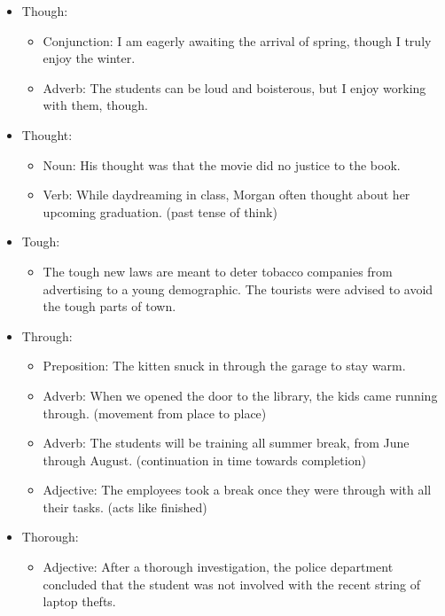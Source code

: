 \documentclass[a4paper,12pt]{report}
\begin{document}
\begin{itemize}
  \item Though:
    \begin{itemize}
      \item Conjunction: I am eagerly awaiting the arrival of spring, though I truly enjoy the winter.
      \item Adverb: The students can be loud and boisterous, but I enjoy working with them, though.
    \end{itemize}
  \item Thought:
    \begin{itemize}
      \item Noun: His thought was that the movie did no justice to the book.
      \item Verb: While daydreaming in class, Morgan often thought about her upcoming graduation. (past tense of think)
    \end{itemize}
  \item Tough:
    \begin{itemize}
      \item The tough new laws are meant to deter tobacco companies from advertising to a young demographic. The tourists were advised to avoid the tough parts of town.
    \end{itemize}
  \item Through:
    \begin{itemize}
      \item Preposition: The kitten snuck in through the garage to stay warm.
      \item Adverb: When we opened the door to the library, the kids came running through. (movement from place to place)
      \item Adverb: The students will be training all summer break, from June through August. (continuation in time towards completion)
      \item Adjective: The employees took a break once they were through with all their tasks. (acts like finished)
    \end{itemize}
  \item Thorough:
    \begin{itemize}
      \item Adjective: After a thorough investigation, the police department concluded that the student was not involved with the recent string of laptop thefts.
    \end{itemize}
\end{itemize}
\end{document}

